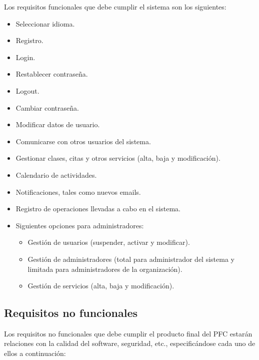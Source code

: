 Los requisitos funcionales que debe cumplir el sistema son los siguientes: 

\begin{itemize}
\item Seleccionar idioma.
\item Registro.
\item Login.
\item Restablecer contraseña.
\item Logout.
\item Cambiar contraseña.
\item Modificar datos de usuario.
\item Comunicarse con otros usuarios del sistema.
\item Gestionar clases, citas y otros servicios (alta, baja y modificación).
\item Calendario de actividades.
\item Notificaciones, tales como nuevos emails.
\item Registro de operaciones llevadas a cabo en el sistema.
\item Siguientes opciones para administradores:
\begin{itemize}
\item Gestión de usuarios (suspender, activar y modificar).
\item Gestión de administradores (total para administrador del sistema y limitada para administradores de la organización).
\item Gestión de servicios (alta, baja y modificación).
\end{itemize}
\end{itemize}


\subsection{Requisitos no funcionales}

Los requisitos no funcionales que debe cumplir el producto final del PFC estarán relaciones con la calidad del software, seguridad, etc., especificándose cada uno de ellos a continuación: 

